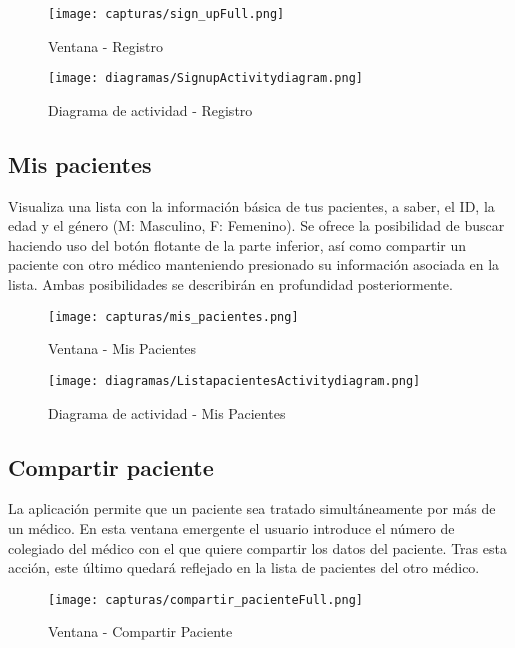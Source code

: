 \documentclass[11pt,spanish,
		listoftables,listoffigures]
		{tfgplantilla}
\begin{document}
\begin{figure}[H]
\centering
\texttt{[image: capturas/sign\_upFull.png]}
\caption{Ventana - Registro}
\end{figure}

\begin{figure}[H]
\centering
\texttt{[image: diagramas/SignupActivitydiagram.png]}
\caption{Diagrama de actividad - Registro}
\end{figure}

\subsection {Mis pacientes}

Visualiza una lista con la información básica de tus pacientes, a saber, el ID, la edad y el género (M: Masculino, F: Femenino). Se ofrece la posibilidad de buscar haciendo uso del botón flotante de la parte inferior, así como compartir un paciente con otro médico manteniendo presionado su información asociada en la lista. Ambas posibilidades se describirán en profundidad posteriormente. 

\begin{figure}[H]
\centering
\texttt{[image: capturas/mis\_pacientes.png]}
\caption{Ventana - Mis Pacientes}
\end{figure}

\begin{figure}[H]
\centering
\texttt{[image: diagramas/ListapacientesActivitydiagram.png]}
\caption{Diagrama de actividad - Mis Pacientes}
\end{figure}

\subsection {Compartir paciente}

La aplicación permite que un paciente sea tratado simultáneamente  por más de un médico. En esta ventana emergente el usuario introduce el número de colegiado del médico con el que quiere compartir los datos del paciente. Tras esta acción, este último quedará reflejado en la lista de pacientes del otro médico.

\begin{figure}[H]
\centering
\texttt{[image: capturas/compartir\_pacienteFull.png]}
\caption{Ventana - Compartir Paciente}
\end{figure}
\end{document}
